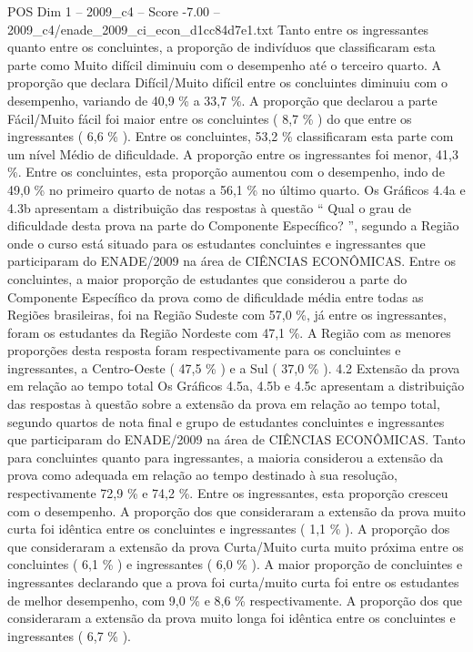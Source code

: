 \begin{textsample}{POS Dim 1 – 2009\_c4 – Score -7.00 – 2009\_c4/enade\_2009\_ci\_econ\_d1cc84d7e1.txt}
Tanto entre os ingressantes quanto entre os concluintes, a proporção de indivíduos que classificaram esta parte como Muito difícil diminuiu com o desempenho até o terceiro quarto.
A proporção que declara Difícil/Muito difícil entre os concluintes diminuiu com o desempenho, variando de 40,9 \% a 33,7 \%.
A proporção que declarou a parte Fácil/Muito fácil foi maior entre os concluintes ( 8,7 \% ) do que entre os ingressantes ( 6,6 \% ).
Entre os concluintes, 53,2 \% classificaram esta parte com um nível Médio de dificuldade.
A proporção entre os ingressantes foi menor, 41,3 \%.
Entre os concluintes, esta proporção aumentou com o desempenho, indo de 49,0 \% no primeiro quarto de notas a 56,1 \% no último quarto.
Os Gráficos 4.4a e 4.3b apresentam a distribuição das respostas à questão “ Qual o grau de dificuldade desta prova na parte do Componente Específico? ”, segundo a Região onde o curso está situado para os estudantes concluintes e ingressantes que participaram do ENADE/2009 na área de CIÊNCIAS ECONÔMICAS.
Entre os concluintes, a maior proporção de estudantes que considerou a parte do Componente Específico da prova como de dificuldade média entre todas as Regiões brasileiras, foi na Região Sudeste com 57,0 \%, já entre os ingressantes, foram os estudantes da Região Nordeste com 47,1 \%.
A Região com as menores proporções desta resposta foram respectivamente para os concluintes e ingressantes, a Centro-Oeste ( 47,5 \% ) e a Sul ( 37,0 \% ). 4.2 Extensão da prova em relação ao tempo total Os Gráficos 4.5a, 4.5b e 4.5c apresentam a distribuição das respostas à questão sobre a extensão da prova em relação ao tempo total, segundo quartos de nota final e grupo de estudantes concluintes e ingressantes que participaram do ENADE/2009 na área de CIÊNCIAS ECONÔMICAS.
Tanto para concluintes quanto para ingressantes, a maioria considerou a extensão da prova como adequada em relação ao tempo destinado à sua resolução, respectivamente 72,9 \% e 74,2 \%.
Entre os ingressantes, esta proporção cresceu com o desempenho.
A proporção dos que consideraram a extensão da prova muito curta foi idêntica entre os concluintes e ingressantes ( 1,1 \% ).
A proporção dos que consideraram a extensão da prova Curta/Muito curta muito próxima entre os concluintes ( 6,1 \% ) e ingressantes ( 6,0 \% ).
A maior proporção de concluintes e ingressantes declarando que a prova foi curta/muito curta foi entre os estudantes de melhor desempenho, com 9,0 \% e 8,6 \% respectivamente.
A proporção dos que consideraram a extensão da prova muito longa foi idêntica entre os concluintes e ingressantes ( 6,7 \% ).

\end{textsample}
